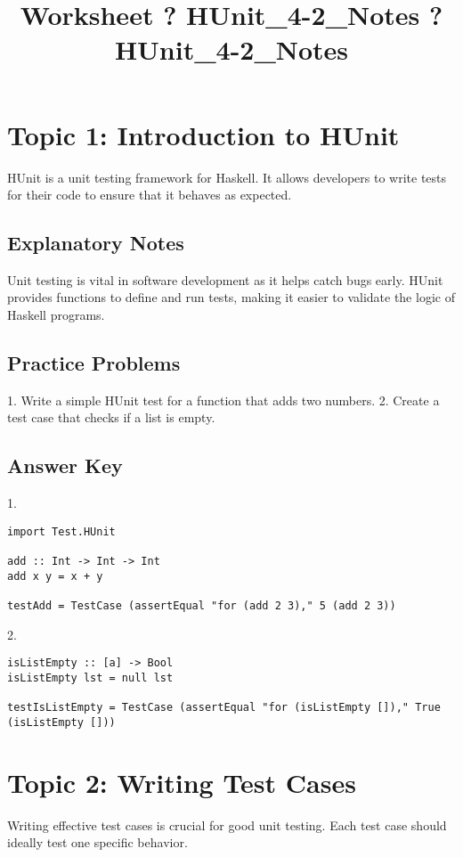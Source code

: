 \documentclass{article}
\title{Worksheet ? HUnit\_4-2\_Notes ? HUnit\_4-2\_Notes}
\author{}
\date{}
\begin{document}
\maketitle

\section*{Topic 1: Introduction to HUnit}
HUnit is a unit testing framework for Haskell. It allows developers to write tests for their code to ensure that it behaves as expected.

\subsection*{Explanatory Notes}
Unit testing is vital in software development as it helps catch bugs early. HUnit provides functions to define and run tests, making it easier to validate the logic of Haskell programs.

\subsection*{Practice Problems}
1. Write a simple HUnit test for a function that adds two numbers.
2. Create a test case that checks if a list is empty.

\subsection*{Answer Key}
1. 
\begin{verbatim}
import Test.HUnit

add :: Int -> Int -> Int
add x y = x + y

testAdd = TestCase (assertEqual "for (add 2 3)," 5 (add 2 3))
\end{verbatim}

2. 
\begin{verbatim}
isListEmpty :: [a] -> Bool
isListEmpty lst = null lst

testIsListEmpty = TestCase (assertEqual "for (isListEmpty [])," True (isListEmpty []))
\end{verbatim}

\section*{Topic 2: Writing Test Cases}
Writing effective test cases is crucial for good unit testing. Each test case should ideally test one specific behavior.
\end{document}
